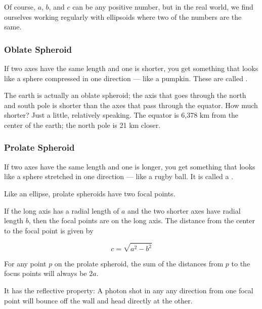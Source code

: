 Of course, $a$, $b$, and $c$ can be any positive number, but in the
real world, we find ourselves working regularly with ellipsoids where two
of the numbers are the same.

\subsubsection{Oblate Spheroid}

If two axes have the same length and one is shorter, you get something
that looks like a sphere compressed in one direction --- like a
pumpkin.  These are called .

The earth is actually an oblate spheroid; the axis that goes through
the north and south pole is shorter than the axes that pass through
the equator.  How much shorter? Just a little, relatively speaking. The equator is 6,378 km
from the center of the earth; the north pole is 21 km closer.

\subsubsection{Prolate Spheroid}

If two axes have the same length and one is longer, you get something
that looks like a sphere stretched in one direction --- like a rugby
ball. It is called a .

Like an ellipse, prolate spheroids have two focal points.

\begin{mdframed}[style=important, frametitle={Focal Points of a Prolate Spheroid}]

  If the long axis has a radial length of $a$ and the two shorter axes
  have radial length $b$, then the focal points are on the long axis.  The distance from the center to the focal point is given by

  $$c = \sqrt{a^2 - b^2}$$

  For any point $p$ on the prolate spheroid, the sum of the distances
  from $p$ to the focus points will always be $2a$.

  It has the reflective property: A photon shot in any any direction
  from one focal point will bounce off the wall and head directly at the other.
  
\end{mdframed}


